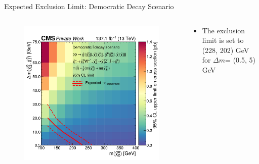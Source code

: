 \begin{frame}[fragile]{Expected Exclusion Limit: Democratic \PSl Decay Scenario}
  \begin{columns}
    \begin{column}{0.5\textwidth}

      \begin{figure}[htpb]
        \centering
        \includegraphics[width=1.0\textwidth]{fig/exclusion-3d/Limit3D_democratic.pdf}
      \end{figure}

    \end{column}
    \begin{column}{0.5\textwidth}
      \begin{itemize}
        \item The exclusion limit is set to (228, 202) GeV for \(\Delta m\)= (0.5, 5) GeV
      \end{itemize}
      
      
    \end{column}
  \end{columns}


\end{frame}

